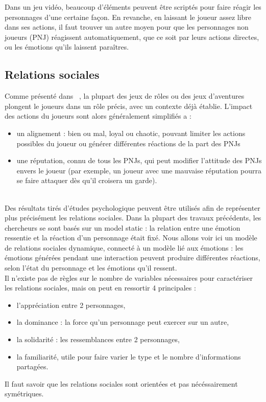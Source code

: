 \documentclass[asi]{picINSA}
\begin{document}
Dans un jeu vidéo, beaucoup d'éléments peuvent être scriptés pour faire réagir les personnages d'une certaine façon. En revanche, en laissant le joueur assez libre dans ses actions, il faut trouver un autre moyen pour que les personnages non joueurs (PNJ) réagissent automatiquement, que ce soit par leurs actions directes, ou les émotions qu'ils laissent paraîtres.\\

\subsection{Relations sociales}

Comme présenté dans ~\cite{IRIS:conf/aiide/OchsSC2008}, la plupart des jeux de rôles ou des jeux d'aventures plongent le joueurs dans un rôle précis, avec un contexte déjà établie. L'impact des actions du joueurs sont alors généralement simplifiés a :

\begin{itemize}
\item un alignement : bien ou mal, loyal ou chaotic, pouvant limiter
  les actions possibles du joueur ou générer différentes réactions de
  la part des PNJs

\item une réputation, connu de tous les PNJs, qui peut modifier
  l'attitude des PNJs envers le joueur (par exemple, un joueur avec
  une mauvaise réputation pourra se faire attaquer dès qu'il croisera
  un garde).
\end{itemize}

~\\
Des résultats tirés d'études psychologique peuvent être utilisés afin de représenter plus précisément les relations sociales. Dans la plupart des travaux précédents, les chercheurs se sont basés sur un model static : la relation entre une émotion ressentie et la réaction d'un personnage était fixé. Nous allons voir ici un modèle de relations sociales dynamique, connecté à un modèle lié aux émotions : les émotions générées pendant une interaction peuvent produire différentes réactions, selon l'état du personnage et les émotions qu'il ressent.\\

Il n'existe pas de règles sur le nombre de variables nécessaires pour caractériser les relations sociales, mais on peut en ressortir 4 principales : 
\begin{itemize}
\item l'appréciation entre 2 personnages,
\item la dominance : la force qu'un personnage peut exercer sur un autre,
\item la solidarité : les ressemblances entre 2 personnages,
\item la familiarité, utile pour faire varier le type et le nombre d'informations partagées.
\end{itemize}
Il faut savoir que les relations sociales sont orientées et pas nécéssairement symétriques.\\
\end{document}
